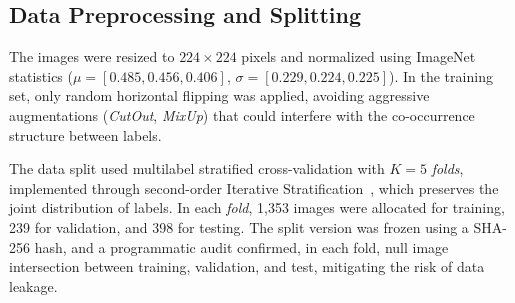 \documentclass[12pt]{article}
\begin{document}



\subsection{Data Preprocessing and Splitting}

The images were resized to $224\times 224$ pixels and normalized using ImageNet statistics ($\mu=[0.485,0.456,0.406]$, $\sigma=[0.229,0.224,0.225]$). In the training set, only random horizontal flipping was applied, avoiding aggressive augmentations (\textit{CutOut}, \textit{MixUp}) that could interfere with the co-occurrence structure between labels.

The data split used multilabel stratified cross-validation with $K=5$ \textit{folds}, implemented through second-order Iterative Stratification~\cite{Sechidis2011}, which preserves the joint distribution of labels. In each \textit{fold}, 1,353 images were allocated for training, 239 for validation, and 398 for testing. The split version was frozen using a SHA-256 hash, and a programmatic audit confirmed, in each fold, null image intersection between training, validation, and test, mitigating the risk of data leakage.

\end{document}
